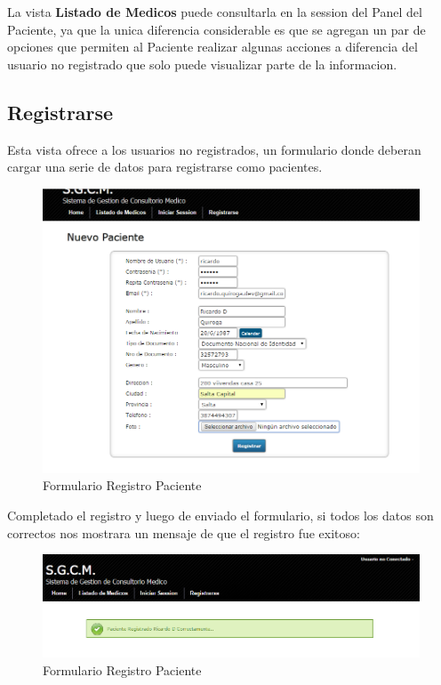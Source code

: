 La vista \textbf{Listado de Medicos} puede consultarla en la session del
Panel del Paciente, ya que la unica diferencia considerable es que se agregan un
par de opciones que permiten al Paciente realizar algunas acciones a diferencia
del usuario no registrado que solo puede visualizar parte de la informacion.


\subsection{Registrarse}

Esta vista ofrece a los usuarios no registrados, un formulario donde deberan
cargar una serie de datos para registrarse como pacientes.

\begin{figure}[H]
    \centering
    \includegraphics[scale=0.5]{resourse/registrar-paciente.png}
    \caption{Formulario Registro Paciente}
    \label{fig:62}
\end{figure}

Completado el registro y luego de enviado el formulario, si todos los datos son
correctos nos mostrara un mensaje de que el registro fue exitoso:

\begin{figure}[H]
    \centering
    \includegraphics[scale=0.5]{resourse/registro-exito.png}
    \caption{Formulario Registro Paciente}
    \label{fig:63}
\end{figure}

